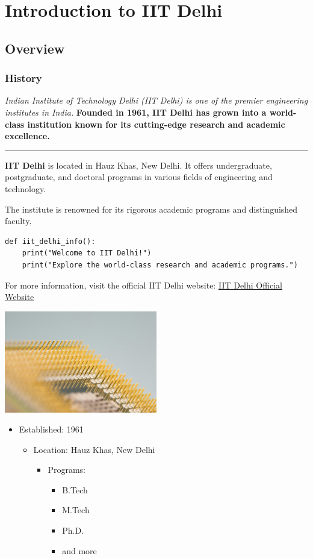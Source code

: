 \documentclass{article}
\begin{document}
\section{Introduction to IIT Delhi}
\subsection{Overview}
\subsubsection{History}

\textit{Indian Institute of Technology Delhi (IIT Delhi) is one of the premier engineering institutes in India.}
\textbf{Founded in 1961, IIT Delhi has grown into a world-class institution known for its cutting-edge research and academic excellence.}

\hrule

\textbf{IIT Delhi} is located in Hauz Khas, New Delhi. It offers undergraduate, postgraduate, and doctoral programs in various fields of engineering and technology.\par
The institute is renowned for its rigorous academic programs and distinguished faculty.

\begin{verbatim}
def iit_delhi_info():
    print("Welcome to IIT Delhi!")
    print("Explore the world-class research and academic programs.")
\end{verbatim}

For more information, visit the official IIT Delhi website: \href{https://www.iitd.ac.in}{IIT Delhi Official Website}

\includegraphics[width=0.5\textwidth]{images/technology.jpg}

\begin{itemize}
    \item Established: 1961
    \begin{itemize}
        \item Location: Hauz Khas, New Delhi
        \begin{itemize}
            \item Programs: 
                \begin{itemize}
                    \item B.Tech
                    \item M.Tech
                    \item Ph.D.
                    \item and more
                \end{itemize}
        \end{itemize}
    \end{itemize}
\end{itemize}
\end{document}
